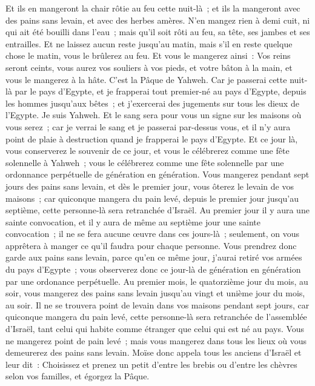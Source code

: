 \begin{multicols}{2}
 Et ils en mangeront la chair rôtie au feu cette nuit-là~; et ils la mangeront avec des pains sans levain, et avec des herbes amères.
N'en mangez rien à demi cuit, ni qui ait été bouilli dans l'eau~; mais qu'il soit rôti au feu, sa tête, ses jambes et ses entrailles.
 Et ne laissez aucun reste jusqu'au matin, mais s'il en reste quelque chose le matin, vous le brûlerez au feu.
Et vous le mangerez ainsi~: Vos reins seront ceints, vous aurez vos souliers à vos pieds, et votre bâton à la main, et vous le mangerez à la hâte. C'est la Pâque de Yahweh.
Car je passerai cette nuit-là par le pays d'Egypte, et je frapperai tout premier-né au pays d'Egypte, depuis les hommes jusqu'aux bêtes~; et j'exercerai des jugements sur tous les dieux de l'Egypte. Je suis Yahweh.
Et le sang sera pour vous un signe sur les maisons où vous serez~; car je verrai le sang et je passerai par-dessus vous, et il n'y aura point de plaie à destruction quand je frapperai le pays d'Egypte.
Et ce jour là, vous conserverez le souvenir de ce jour, et vous le célébrerez comme une fête solennelle à Yahweh~; vous le célébrerez comme une fête solennelle par une ordonnance perpétuelle de génération en génération.
Vous mangerez pendant sept jours des pains sans levain, et dès le premier jour, vous ôterez le levain de vos maisons~; car quiconque mangera du pain levé, depuis le premier jour jusqu'au septième, cette personne-là sera retranchée d'Israël.
Au premier jour il y aura une sainte convocation, et il y aura de même au septième jour une sainte convocation~; il ne se fera aucune œuvre dans ces jours-là~; seulement, on vous apprêtera à manger ce qu'il faudra pour chaque personne.
Vous prendrez donc garde aux pains sans levain, parce qu'en ce même jour, j'aurai retiré vos armées du pays d'Egypte~; vous observerez donc ce jour-là de génération en génération par une ordonance perpétuelle.
Au premier mois, le quatorzième jour du mois, au soir, vous mangerez des pains sans levain jusqu'au vingt et unième jour du mois, au soir.
Il ne se trouvera point de levain dans vos maisons pendant sept jours, car quiconque mangera du pain levé, cette personne-là sera retranchée de l'assemblée d'Israël, tant celui qui habite comme étranger que celui qui est né au pays.
Vous ne mangerez point de pain levé~; mais vous mangerez dans tous les lieux où vous demeurerez des pains sans levain.
Moïse donc appela tous les anciens d'Israël et leur dit~: Choisissez et prenez un petit d'entre les brebis ou d'entre les chèvres selon vos familles, et égorgez la Pâque.

\end{multicols}
